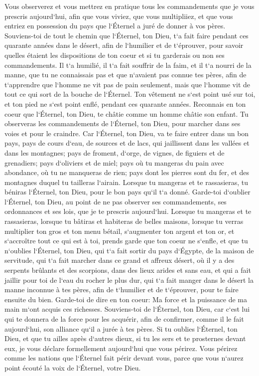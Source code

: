 \verse Vous observerez et vous mettrez en pratique tous les commandements que je vous prescris aujourd`hui, afin que vous viviez, que vous multipliiez, et que vous entriez en possession du pays que l`Éternel a juré de donner à vos pères. 
\verse Souviens-toi de tout le chemin que l`Éternel, ton Dieu, t`a fait faire pendant ces quarante années dans le désert, afin de l`humilier et de t`éprouver, pour savoir quelles étaient les dispositions de ton coeur et si tu garderais ou non ses commandements. 
\verse Il t`a humilié, il t`a fait souffrir de la faim, et il t`a nourri de la manne, que tu ne connaissais pas et que n`avaient pas connue tes pères, afin de t`apprendre que l`homme ne vit pas de pain seulement, mais que l`homme vit de tout ce qui sort de la bouche de l`Éternel. 
\verse Ton vêtement ne s`est point usé sur toi, et ton pied ne s`est point enflé, pendant ces quarante années. 
\verse Reconnais en ton coeur que l`Éternel, ton Dieu, te châtie comme un homme châtie son enfant. 
\verse Tu observeras les commandements de l`Éternel, ton Dieu, pour marcher dans ses voies et pour le craindre. 
\verse Car l`Éternel, ton Dieu, va te faire entrer dans un bon pays, pays de cours d`eau, de sources et de lacs, qui jaillissent dans les vallées et dans les montagnes; 
\verse pays de froment, d`orge, de vignes, de figuiers et de grenadiers; pays d`oliviers et de miel; 
\verse pays où tu mangeras du pain avec abondance, où tu ne manqueras de rien; pays dont les pierres sont du fer, et des montagnes duquel tu tailleras l`airain. 
\verse Lorsque tu mangeras et te rassasieras, tu béniras l`Éternel, ton Dieu, pour le bon pays qu`il t`a donné. 
\verse Garde-toi d`oublier l`Éternel, ton Dieu, au point de ne pas observer ses commandements, ses ordonnances et ses lois, que je te prescris aujourd`hui. 
\verse Lorsque tu mangeras et te rassasieras, lorsque tu bâtiras et habiteras de belles maisons, 
\verse lorsque tu verras multiplier ton gros et ton menu bétail, s`augmenter ton argent et ton or, et s`accroître tout ce qui est à toi, 
\verse prends garde que ton coeur ne s`enfle, et que tu n`oublies l`Éternel, ton Dieu, qui t`a fait sortir du pays d`Égypte, de la maison de servitude, 
\verse qui t`a fait marcher dans ce grand et affreux désert, où il y a des serpents brûlants et des scorpions, dans des lieux arides et sans eau, et qui a fait jaillir pour toi de l`eau du rocher le plus dur, 
\verse qui t`a fait manger dans le désert la manne inconnue à tes pères, afin de t`humilier et de t`éprouver, pour te faire ensuite du bien. 
\verse Garde-toi de dire en ton coeur: Ma force et la puissance de ma main m`ont acquis ces richesses. 
\verse Souviens-toi de l`Éternel, ton Dieu, car c`est lui qui te donnera de la force pour les acquérir, afin de confirmer, comme il le fait aujourd`hui, son alliance qu`il a jurée à tes pères. 
\verse Si tu oublies l`Éternel, ton Dieu, et que tu ailles après d`autres dieux, si tu les sers et te prosternes devant eux, je vous déclare formellement aujourd`hui que vous périrez. 
\verse Vous périrez comme les nations que l`Éternel fait périr devant vous, parce que vous n`aurez point écouté la voix de l`Éternel, votre Dieu. 

